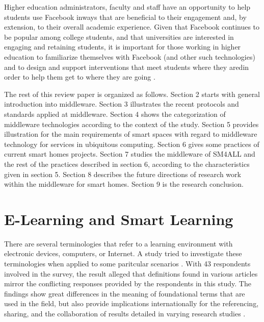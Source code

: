 \documentclass[journal]{vgtc}                %
\begin{document}
Higher education administrators, faculty and staff have an opportunity to help students use Facebook inways that are beneficial to their engagement and, by extension, to their overall academic experience. Given that Facebook continues to be popular among college students, and that universities are interested in engaging and retaining students, it is important for those working in higher education to familiarize themselves with Facebook (and other such technologies) and to design and support interventions that meet students where they aredin order to help them get to where they are going \cite{Junco2012}.


The rest of this review paper is organized as follows. Section 2 starts with general introduction into middleware. Section 3 illustrates the recent protocols and standards applied at middleware. Section 4 shows the categorization of middleware technologies according to the context of the study. Section 5 provides illustration for the main requirements of smart spaces with regard to middleware technology for services in ubiquitous computing. Section 6 gives some practices of current smart homes projects. Section 7 studies the middleware of SM4ALL and the rest of the practices described in section 6, according to the characteristics given in section 5. Section 8 describes the future directions of research work within the middleware for smart homes. Section 9 is the research conclusion.


\section{E-Learning and Smart Learning}
There are several terminologies that refer to a learning environment with electronic devices, computers, or Internet. A study tried to investigate these terminologies when applied to some paritcular scenarios \cite{Moore2011}. With 43 respondents involved in the survey, the result alleged that definitions found in various articles mirror the conflicting responses provided by the respondents in this study. The findings show great differences in the meaning of foundational terms that are used in the field, but also provide implications internationally for the referencing, sharing, and the collaboration of results detailed in varying research studies \cite{Moore2011}.
\end{document}
